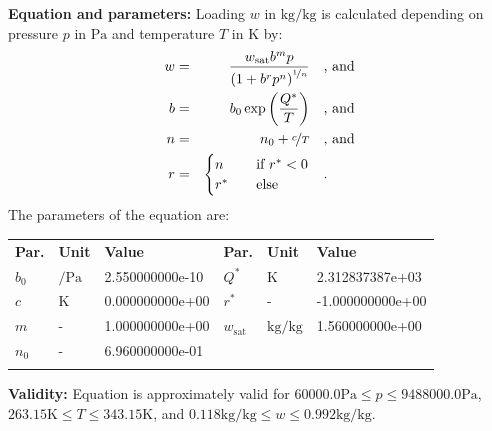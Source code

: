 \textbf{Equation and parameters:}
\newline
%
Loading $w$ in $\si{\kilogram\per\kilogram}$ is calculated depending on pressure $p$ in $\si{\pascal}$ and temperature $T$ in $\si{\kelvin}$ by:
%
\begin{equation*}
\begin{split}
w &=& \frac{w_\mathrm{sat} b^{m} p}{\left( 1 + b^{r} p^{n} \right)^{\nicefrac{1}{n}}} & \quad\text{, and} \\
b &=& b_0 \exp\left( \frac{Q^{*}}{T} \right) & \quad\text{, and} \\
n &=& n_0 + \nicefrac{c}{T} & \quad\text{, and} \\
r &=& \begin{cases} n & \quad \text{if } r^{*} < 0 \\ r^{*}  & \quad \text{else} \end{cases} & \quad\text{.}
\end{split}
\end{equation*}
%
The parameters of the equation are:
%
\begin{longtable}[l]{lll|lll}
\toprule
\addlinespace
\textbf{Par.} & \textbf{Unit} & \textbf{Value} &	\textbf{Par.} & \textbf{Unit} & \textbf{Value} \\
\addlinespace
\midrule
\endhead

\bottomrule
\endfoot
\bottomrule
\endlastfoot
\addlinespace

$b_0$ & $\si{\per\pascal}$ & 2.550000000e-10 & $Q^{*}$ & $\si{\kelvin}$ & 2.312837387e+03 \\
$c$ & $\si{\kelvin}$ & 0.000000000e+00 & $r^{*}$ & - & -1.000000000e+00 \\
$m$ & - & 1.000000000e+00 & $w_\mathrm{sat}$ & $\si{\kilogram\per\kilogram}$ & 1.560000000e+00 \\
$n_0$ & - & 6.960000000e-01 & & & \\

\addlinespace\end{longtable}

\textbf{Validity:}
\newline
Equation is approximately valid for $60000.0 \si{\pascal} \leq p \leq 9488000.0 \si{\pascal}$,  $263.15 \si{\kelvin} \leq T \leq 343.15 \si{\kelvin}$, and $0.118 \si{\kilogram\per\kilogram} \leq w \leq 0.992 \si{\kilogram\per\kilogram}$.
\newline

